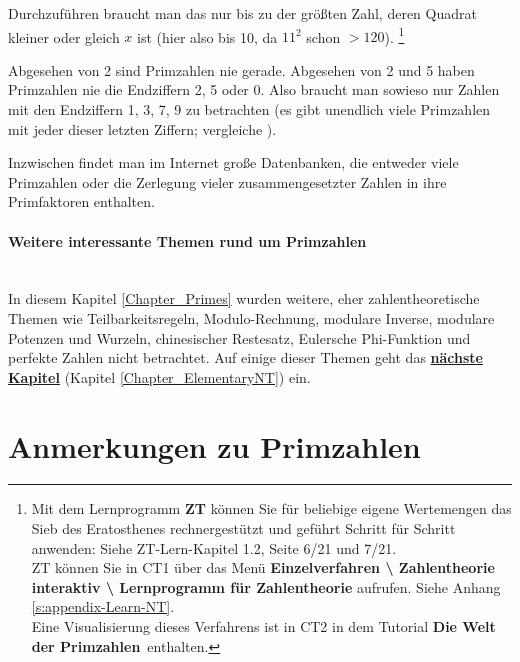 \begin{refsegment}
Durchzuführen braucht man das nur bis zu der größten Zahl,
deren Quadrat kleiner oder gleich $x$ ist (hier also bis 10, da $11^2$ schon $> 120$).%
\footnote{%
%
%
Mit dem Lernprogramm {\bf ZT} können Sie für beliebige eigene Wertemengen
das Sieb des Eratosthenes rechnergestützt und geführt Schritt für
Schritt anwenden: Siehe ZT-Lern-Kapitel 1.2, Seite 6/21 und 7/21.\\
ZT können Sie in CT1 über das Menü
{\bf Einzelverfahren \textbackslash{} Zahlentheorie interaktiv \textbackslash{}
Lernprogramm für Zahlentheorie} aufrufen.
    Siehe Anhang \ref{s:appendix-Learn-NT}.\\
    Eine Visualisierung dieses Verfahrens ist in CT2
    in dem Tutorial \textbf{\glqq Die Welt der Primzahlen\grqq}~enthalten.
}


Abgesehen von 2 sind Primzahlen nie gerade. Abgesehen von 2 und 5 haben Primzahlen nie die
Endziffern 2, 5 oder 0. Also braucht man sowieso nur Zahlen mit den Endziffern 1, 3, 7, 9 zu
betrachten (es gibt unendlich viele Primzahlen mit jeder dieser letzten Ziffern; vergleiche
\cite[Bd. 1, S. 137]{Tietze1973}).

Inzwischen findet man im Internet große Datenbanken, die entweder viele
Primzahlen oder die Zerlegung vieler zusammengesetzter Zahlen
in ihre Primfaktoren enthalten.


\paragraph*{Weitere interessante Themen rund um Primzahlen} \mbox{}\\
In diesem Kapitel \ref{Chapter_Primes} wurden weitere, eher zahlentheoretische
Themen wie Teilbarkeitsregeln, Modulo-Rechnung, modulare Inverse, modulare Potenzen
und Wurzeln, chinesischer Restesatz, Eulersche Phi-Funktion und perfekte Zahlen
nicht betrachtet. Auf einige dieser Themen geht das \hyperlink{Chapter_ElementaryNT}
{{\bf nächste Kapitel}} (Kapitel \ref{Chapter_ElementaryNT}) ein.



\pagebreak
\hypertarget{h_Notes-about-primes}{}
\section{Anmerkungen zu Primzahlen}
\label{l_Notes-about-primes}


\end{refsegment}
